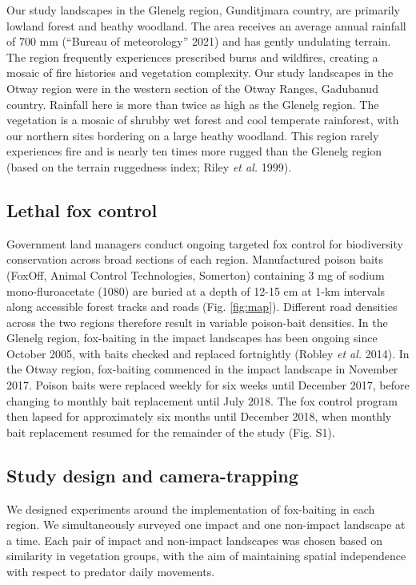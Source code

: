 \documentclass[]{elsarticle} %
\begin{document}
Our study landscapes in the Glenelg region, Gunditjmara country, are primarily lowland forest and heathy woodland. The area receives an average annual rainfall of 700 mm (``Bureau of meteorology'' 2021) and has gently undulating terrain. The region frequently experiences prescribed burns and wildfires, creating a mosaic of fire histories and vegetation complexity. Our study landscapes in the Otway region were in the western section of the Otway Ranges, Gadubanud country. Rainfall here is more than twice as high as the Glenelg region. The vegetation is a mosaic of shrubby wet forest and cool temperate rainforest, with our northern sites bordering on a large heathy woodland. This region rarely experiences fire and is nearly ten times more rugged than the Glenelg region (based on the terrain ruggedness index; Riley \emph{et al.} 1999).

\hypertarget{lethal-fox-control}{%
\subsection{Lethal fox control}\label{lethal-fox-control}}

Government land managers conduct ongoing targeted fox control for biodiversity conservation across broad sections of each region. Manufactured poison baits (FoxOff, Animal Control Technologies, Somerton) containing 3 mg of sodium mono-fluroacetate (1080) are buried at a depth of 12-15 cm at 1-km intervals along accessible forest tracks and roads (Fig. \ref{fig:map}). Different road densities across the two regions therefore result in variable poison-bait densities. In the Glenelg region, fox-baiting in the impact landscapes has been ongoing since October 2005, with baits checked and replaced fortnightly (Robley \emph{et al.} 2014). In the Otway region, fox-baiting commenced in the impact landscape in November 2017. Poison baits were replaced weekly for six weeks until December 2017, before changing to monthly bait replacement until July 2018. The fox control program then lapsed for approximately six months until December 2018, when monthly bait replacement resumed for the remainder of the study (Fig. S1).

\hypertarget{study-design-and-camera-trapping}{%
\subsection{Study design and camera-trapping}\label{study-design-and-camera-trapping}}

We designed experiments around the implementation of fox-baiting in each region. We simultaneously surveyed one impact and one non-impact landscape at a time. Each pair of impact and non-impact landscapes was chosen based on similarity in vegetation groups, with the aim of maintaining spatial independence with respect to predator daily movements.
\end{document}
